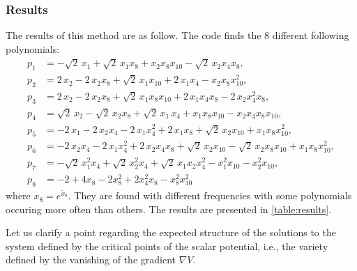 \documentclass[11pt]{article}
\begin{document}
	\subsubsection{Results}
	
	The results of this method are as follow. The code finds the 8 different following polynomials: 
	\begin{subequations} \label{eq:pols}
    \begin{align}
      p_{1} &= -\sqrt{2}\,x_{1} + \sqrt{2}\,x_{1}x_8 + x_{2}x_8x_{10} - \sqrt{2}\,x_{2}x_{4}x_8,\\
      p_{2} &= 2\,x_{2} - 2\,x_{2}x_8 + \sqrt{2}\,x_{1}x_{10} + 2\,x_{1}x_{4} - x_{2}x_8x_{10}^{2},\\
      p_{3} &= 2\,x_{2} - 2\,x_{2}x_8 + \sqrt{2}\,x_{1}x_8x_{10} + 2\,x_{1}x_{4}x_8
      		- 2\,x_{2} x_{4}^{2}x_8,\\
      p_{4} &= \sqrt{2}\,x_{2} - \sqrt{2}\,x_{2}x_8 + \sqrt{2}\,x_{1}\,x_{4} + x_{1}x_8x_{10}
      		- x_{2}x_{4}x_8x_{10},\\
      p_{5} &= -2\,x_{1} - 2\,x_{2}x_{4}- 2\,x_{1}x_{4}^{2} + 2\,x_{1}x_8 + \sqrt{2}\,x_{2}x_{10}
      		+ x_{1}x_8x_{10}^{2},\\
      p_{6} &= -2\,x_{2}x_{4} - 2\,x_{1}x_{4}^{2} + 2\,x_{2}x_{4}x_8 + \sqrt{2}\,x_{2}x_{10} 
      		- \sqrt{2}\,x_{2}x_8x_{10} +  x_{1}x_8x_{10}^{2},\\
      p_{7} &= -\sqrt{2}\,x_{1}^{2}x_{4} + \sqrt{2}\,x_{2}^{2}x_{4} + \sqrt{2}\,x_{1}x_{2}x_{4}^{2} - x_{1}^{2}x_{10}
      		- x_{2}^{2}x_{10}, \\
      p_{8} &= -2 + 4 x_{8} - 2 x_8^2 + 2 x_{4}^2 x_8 - x_8^2 x_{10}^2
    \end{align}
  \end{subequations}
  where $x_{8} = e^{\tilde{x}_{8}}$. They are found with different frequencies with some polynomials occuring more often than others. The results are presented in \eqref{table:results}.
  
  	Let us clarify a point regarding the expected structure of the solutions to the system defined by the critical points of the scalar potential, i.e., the variety defined by the vanishing of the gradient $\nabla V$.
  
\end{document}
